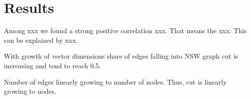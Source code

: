 \section{Results}\label{sec:METHODRESULTS}


Among xxx we found a strong positive correlation xxx. That means the xxx.
This can be explained by xxx.


With growth of vector dimensions share of edges falling into NSW graph cut is increasing and tend to reach 0.5.

Number of edges linearly growing to number of nodes. Thus, cut is linearly growing to nodes.